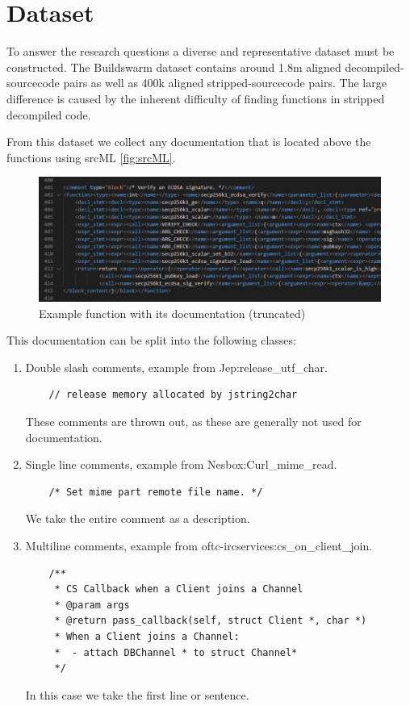 \section{Dataset}
To answer the research questions a diverse and representative dataset must be constructed. The Buildswarm dataset contains around 1.8m aligned decompiled-sourcecode pairs as well as 400k aligned stripped-sourcecode pairs. The large difference is caused by the inherent difficulty of finding functions in stripped decompiled code. 

From this dataset we collect any documentation that is located above the functions using srcML \ref{fig:srcML}. 
\label{fig:srcML}
\begin{figure}[H]
  \centering
  \includegraphics[width=\linewidth]{img/srcML.png}
  \caption{Example function with its documentation (truncated)}
\end{figure}

This documentation can be split into the following classes: 
\begin{enumerate}
  \item Double slash comments, example from Jep:release\_utf\_char. 
\begin{verbatim}
    // release memory allocated by jstring2char
\end{verbatim}
    These comments are thrown out, as these are generally not used for documentation.
  \item Single line comments, example from Nesbox:Curl\_mime\_read.
\begin{verbatim}
    /* Set mime part remote file name. */
\end{verbatim}
   We take the entire comment as a description.
  \item Multiline comments, example from oftc-ircservices:cs\_on\_client\_join.
\begin{verbatim}
    /**
     * CS Callback when a Client joins a Channel
     * @param args 
     * @return pass_callback(self, struct Client *, char *)
     * When a Client joins a Channel:
     *  - attach DBChannel * to struct Channel*
     */
\end{verbatim}
    In this case we take the first line or sentence.
\end{enumerate}



